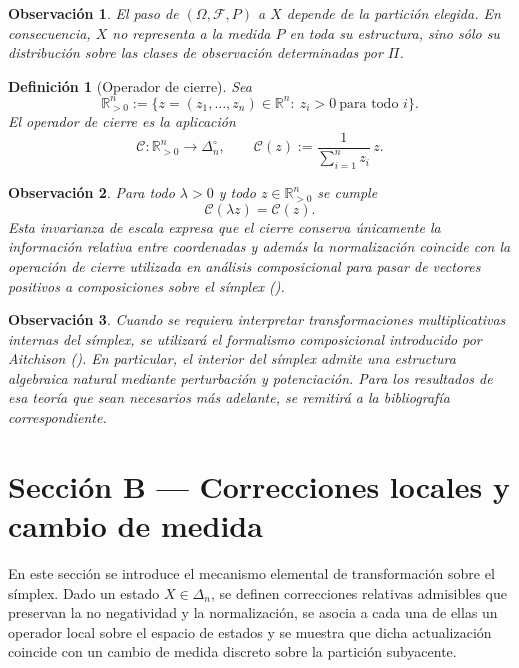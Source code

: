 ﻿\documentclass[12pt]{article}
\newtheorem{definicion}{Definición}[section]
\newtheorem{observacion}{Observación}[section]
\begin{document}
\begin{observacion}
El paso de $(\Omega,\mathcal F,P)$ a $X$ depende de la partición elegida. En consecuencia, $X$ no representa a la medida $P$ en toda su estructura, sino sólo su distribución sobre las clases de observación determinadas por $\Pi$.
\end{observacion}

\begin{definicion}[Operador de cierre]\label{def:cierre}
Sea
\[
\mathbb R_{>0}^n:=\{z=(z_1,\dots,z_n)\in\mathbb R^n:\ z_i>0\ \text{para todo } i\}.
\]
El \emph{operador de cierre} es la aplicación
\[
\mathscr{C}:\mathbb R_{>0}^n\to\Delta_n^\circ,
\qquad
\mathscr{C}(z):=\frac{1}{\sum_{i=1}^n z_i}\,z.
\]
\end{definicion}

\begin{observacion}
Para todo $\lambda>0$ y todo $z\in\mathbb R_{>0}^n$ se cumple
\[
\mathscr{C}(\lambda z)=\mathscr{C}(z).
\]
Esta invarianza de escala expresa que el cierre conserva únicamente la información relativa entre coordenadas y además la normalización coincide con la operación de cierre utilizada en análisis composicional para pasar de vectores positivos a composiciones sobre el símplex (\cite{Aitchison1986}).
\end{observacion}

\begin{observacion}
Cuando se requiera interpretar transformaciones multiplicativas internas del símplex, se utilizará el formalismo composicional introducido por Aitchison (\cite{Aitchison1986}). En particular, el interior del símplex admite una estructura algebraica natural mediante perturbación y potenciación. Para los resultados de esa teoría que sean necesarios más adelante, se remitirá a la bibliografía correspondiente.
\end{observacion}
\section{Sección B — Correcciones locales y cambio de medida}

En este sección  se introduce el mecanismo elemental de transformación sobre el símplex. Dado un estado $X\in\Delta_n$, se definen correcciones relativas admisibles que preservan la no negatividad y la normalización, se asocia a cada una de ellas un operador local sobre el espacio de estados y se muestra que dicha actualización coincide con un cambio de medida discreto sobre la partición subyacente.
\end{document}
